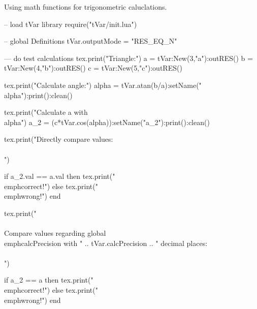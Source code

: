 \documentclass{article}
\begin{document}
Using math functions for trigonometric caluclations.\\
\begin{luacode}
	-- load tVar library
	require("tVar/init.lua")
	  
	-- global Definitions
	tVar.outputMode = "RES_EQ_N"
	
	--- do test calculations
	tex.print("Triangle:")
	a = tVar:New(3,"a"):outRES()
	b = tVar:New(4,"b"):outRES()
	c = tVar:New(5,"c"):outRES()
	
	tex.print("Calculate angle:")
	alpha = tVar.atan(b/a):setName("\\alpha"):print():clean()
	
	tex.print("Calculate a with \\alpha")
	a_2 = (c*tVar.cos(alpha)):setName("a_{2}"):print():clean()
	
	tex.print("Directly compare values:\\\\")
	
	if a_2.val == a.val then
		tex.print("\\emph{correct!}")
	else
		tex.print("\\emph{wrong!}")
	end
	
	tex.print("\\\\Compare values regarding global \\emph{calcPrecision} with " .. tVar.calcPrecision .. " decimal places:\\\\")
	
	if a_2 == a then
		tex.print("\\emph{correct!}")
	else
		tex.print("\\emph{wrong!}")
	end
\end{luacode}
\end{document}
